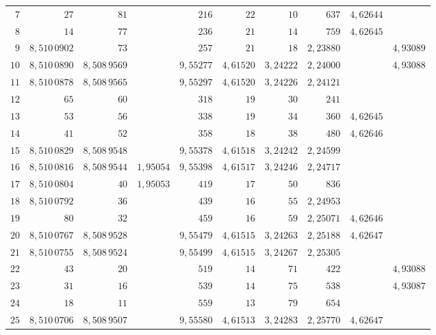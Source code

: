 \begin{center}
\begin{tabular}{r|r|r|r|r|r|r|r|r|r}
\(7\) & \(27\) & \(81\) &  & \(216\) & \(22\) & \(10\) & \(637\) & \(4{,}62644\) &  \\
\(8\) & \(14\) & \(77\) &  & \(236\) & \(21\) & \(14\) & \(759\) & \(4{,}62645\) &  \\
\(9\) & \(8{,}510\,0902\) & \(73\) &  & \(257\) & \(21\) & \(18\) & \(2{,}23880\) &  & \(4{,}93089\) \\
\(10\) & \(8{,}510\,0890\) & \(8{,}508\,9569\) &  & \(9{,}55277\) & \(4{,}61520\) & \(3{,}24222\) & \(2{,}24000\) &  & \(4{,}93088\) \\
\hline
\(11\) & \(8{,}510\,0878\) & \(8{,}508\,9565\) &  & \(9{,}55297\) & \(4{,}61520\) & \(3{,}24226\) & \(2{,}24121\) &  &  \\
\(12\) & \(65\) & \(60\) &  & \(318\) & \(19\) & \(30\) & \(241\) &  &  \\
\(13\) & \(53\) & \(56\) &  & \(338\) & \(19\) & \(34\) & \(360\) & \(4{,}62645\) &  \\
\(14\) & \(41\) & \(52\) &  & \(358\) & \(18\) & \(38\) & \(480\) & \(4{,}62646\) &  \\
\(15\) & \(8{,}510\,0829\) & \(8{,}508\,9548\) &  & \(9{,}55378\) & \(4{,}61518\) & \(3{,}24242\) & \(2{,}24599\) &  &  \\
\hline
\(16\) & \(8{,}510\,0816\) & \(8{,}508\,9544\) & \(1{,}95054\) & \(9{,}55398\) & \(4{,}61517\) & \(3{,}24246\) & \(2{,}24717\) &  &  \\
\(17\) & \(8{,}510\,0804\) & \(40\) & \(1{,}95053\) & \(419\) & \(17\) & \(50\) & \(836\) &  &  \\
\(18\) & \(8{,}510\,0792\) & \(36\) &  & \(439\) & \(16\) & \(55\) & \(2{,}24953\) &  &  \\
\(19\) & \(80\) & \(32\) &  & \(459\) & \(16\) & \(59\) & \(2{,}25071\) & \(4{,}62646\) &  \\
\(20\) & \(8{,}510\,0767\) & \(8{,}508\,9528\) &  & \(9{,}55479\) & \(4{,}61515\) & \(3{,}24263\) & \(2{,}25188\) & \(4{,}62647\) &  \\
\hline
\(21\) & \(8{,}510\,0755\) & \(8{,}508\,9524\) &  & \(9{,}55499\) & \(4{,}61515\) & \(3{,}24267\) & \(2{,}25305\) &  &  \\
\(22\) & \(43\) & \(20\) &  & \(519\) & \(14\) & \(71\) & \(422\) &  & \(4{,}93088\) \\
\(23\) & \(31\) & \(16\) &  & \(539\) & \(14\) & \(75\) & \(538\) &  & \(4{,}93087\) \\
\(24\) & \(18\) & \(11\) &  & \(559\) & \(13\) & \(79\) & \(654\) &  &  \\
\(25\) & \(8{,}510\,0706\) & \(8{,}508\,9507\) &  & \(9{,}55580\) & \(4{,}61513\) & \(3{,}24283\) & \(2{,}25770\) & \(4{,}62647\) &  \\

\end{tabular}
\end{center}
